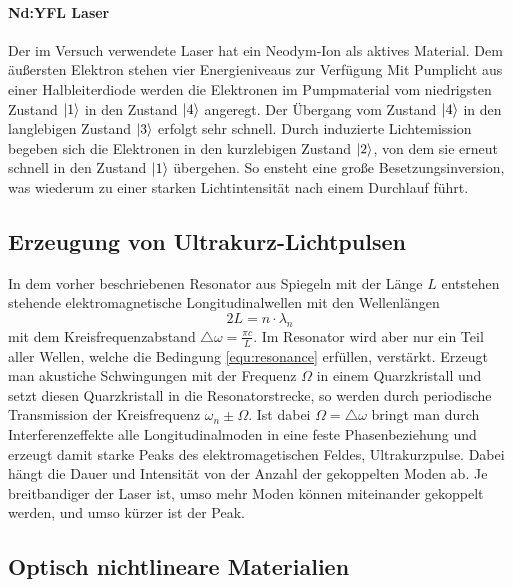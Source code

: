 \paragraph{Nd:YFL Laser}
Der im Versuch verwendete Laser hat ein Neodym-Ion als aktives Material.
Dem äußersten Elektron stehen vier Energieniveaus zur Verfügung
Mit Pumplicht aus einer Halbleiterdiode werden die Elektronen im Pumpmaterial
vom niedrigsten Zustand $\ket{1}$ in den Zustand $\ket{4}$ angeregt. Der Übergang
vom Zustand $\ket{4}$ in den langlebigen Zustand $\ket{3}$ erfolgt sehr
schnell. Durch induzierte Lichtemission begeben sich die Elektronen in den kurzlebigen
Zustand $\ket{2}$, von dem sie erneut schnell in den Zustand $\ket{1}$ übergehen.
So ensteht eine große Besetzungsinversion, was wiederum zu einer starken Lichtintensität
nach einem Durchlauf führt.

\subsection{Erzeugung von Ultrakurz-Lichtpulsen}
In dem vorher beschriebenen Resonator aus Spiegeln mit der Länge $L$
entstehen stehende elektromagnetische Longitudinalwellen mit den Wellenlängen
\begin{equation}
  2L = n \cdot \lambda_n
  \label{equ:resonance}
\end{equation}
mit dem Kreisfrequenzabstand $\triangle \omega = \frac{\pi c}{L}$. 
Im Resonator wird aber nur ein Teil aller Wellen, welche die Bedingung \ref{equ:resonance}
erfüllen, verstärkt. 
Erzeugt man akustiche Schwingungen mit der Frequenz $\Omega$ in einem Quarzkristall
und setzt diesen Quarzkristall in die Resonatorstrecke, so werden durch periodische Transmission
der Kreisfrequenz $\omega_n \pm \Omega$. Ist dabei $\Omega = \triangle \omega$
bringt man durch Interferenzeffekte alle Longitudinalmoden in eine feste Phasenbeziehung
und erzeugt damit starke Peaks des elektromagetischen Feldes, Ultrakurzpulse.
Dabei hängt die Dauer und Intensität von der Anzahl der gekoppelten Moden ab.
Je breitbandiger der Laser ist, umso mehr Moden können miteinander gekoppelt werden,
und umso kürzer ist der Peak.

\subsection{Optisch nichtlineare Materialien}
